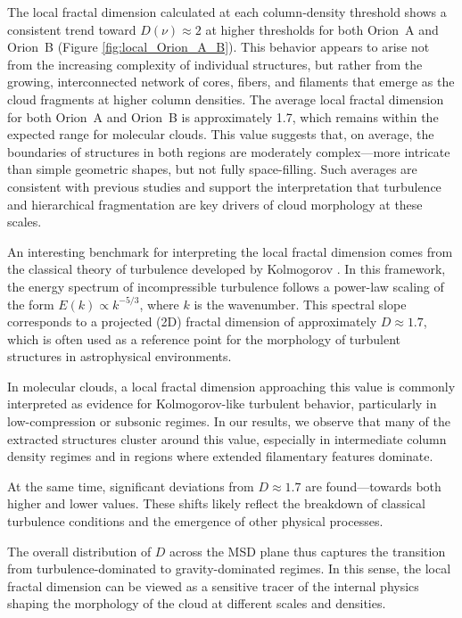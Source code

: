 The local fractal dimension calculated at each column‑density threshold shows a consistent trend toward \(D(\nu) \approx 2\) at higher thresholds for both Orion~A and Orion~B (Figure \ref{fig:local_Orion_A_B}).  
This behavior appears to arise not from the increasing complexity of individual structures, but rather from the growing, interconnected network of cores, fibers, and filaments that emerge as the cloud fragments at higher column densities.
The average local fractal dimension for both Orion~A and Orion~B is approximately 1.7, which remains within the expected range for molecular clouds. This value suggests that, on average, the boundaries of structures in both regions are moderately complex—more intricate than simple geometric shapes, but not fully space-filling. Such averages are consistent with previous studies and support the interpretation that turbulence and hierarchical fragmentation are key drivers of cloud morphology at these scales.

An interesting benchmark for interpreting the local fractal dimension comes from the classical theory of turbulence developed by Kolmogorov \cite{kolmogorov1962refinement}.  
In this framework, the energy spectrum of incompressible turbulence follows a power-law scaling of the form \( E(k) \propto k^{-5/3} \), where \( k \) is the wavenumber.  
This spectral slope corresponds to a projected (2D) fractal dimension of approximately \( D \approx 1.7 \), which is often used as a reference point for the morphology of turbulent structures in astrophysical environments.

In molecular clouds, a local fractal dimension approaching this value is commonly interpreted as evidence for Kolmogorov-like turbulent behavior, particularly in low-compression or subsonic regimes.  
In our results, we observe that many of the extracted structures cluster around this value, especially in intermediate column density regimes and in regions where extended filamentary features dominate.

At the same time, significant deviations from \( D \approx 1.7 \) are found—towards both higher and lower values.  
These shifts likely reflect the breakdown of classical turbulence conditions and the emergence of other physical processes.  

The overall distribution of \( D \) across the MSD plane thus captures the transition from turbulence-dominated to gravity-dominated regimes.  
In this sense, the local fractal dimension can be viewed as a sensitive tracer of the internal physics shaping the morphology of the cloud at different scales and densities.

